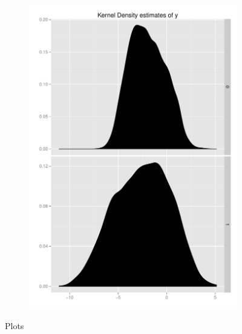 \documentclass[11pt,letterpaper]{article}
\begin{document}
\begin{landscape}
\begin{figure}[h]
    \begin{subfigure}[b]{0.3\textwidth}\centering \includegraphics[width=1\textwidth]{y} \end{subfigure}    
    \caption{Plots}		
\end{figure}	
\end{landscape}
\end{document}
